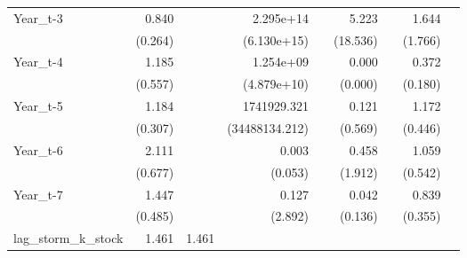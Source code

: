 \begin{table}[htbp]
\begin{tabular}{l*{8}{D{.}{.}{-1}}}
Year\_t-3            &       0.840         &                     &   2.295e+14         &                     &       5.223         &                     &       1.644         &                     \\
                    &     (0.264)         &                     & (6.130e+15)         &                     &    (18.536)         &                     &     (1.766)         &                     \\
Year\_t-4            &       1.185         &                     &   1.254e+09         &                     &       0.000\sym{**} &                     &       0.372\sym{**} &                     \\
                    &     (0.557)         &                     & (4.879e+10)         &                     &     (0.000)         &                     &     (0.180)         &                     \\
Year\_t-5            &       1.184         &                     & 1741929.321         &                     &       0.121         &                     &       1.172         &                     \\
                    &     (0.307)         &                     &(34488134.212)         &                     &     (0.569)         &                     &     (0.446)         &                     \\
Year\_t-6            &       2.111\sym{**} &                     &       0.003         &                     &       0.458         &                     &       1.059         &                     \\
                    &     (0.677)         &                     &     (0.053)         &                     &     (1.912)         &                     &     (0.542)         &                     \\
Year\_t-7            &       1.447         &                     &       0.127         &                     &       0.042         &                     &       0.839         &                     \\
                    &     (0.485)         &                     &     (2.892)         &                     &     (0.136)         &                     &     (0.355)         &                     \\
lag\_storm\_k\_stock   &       1.461         &       1.461         &                     &                     &                     &                     &                     &                     \\

\end{tabular}
\end{table}
